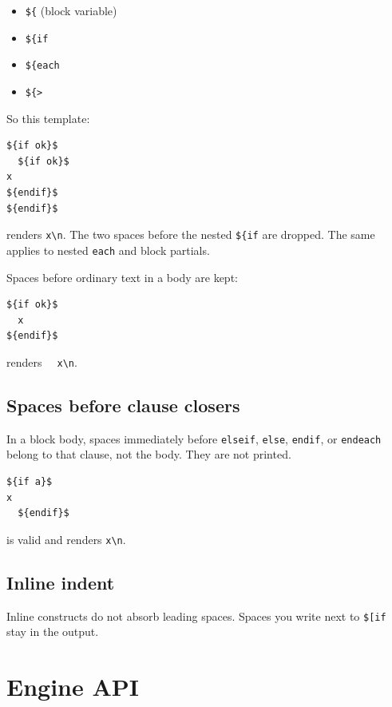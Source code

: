 \documentclass[11pt,letterpaper]{article}
\begin{document}
\begin{itemize}[nosep]
  \item \texttt{\$\{} (block variable)
  \item \texttt{\$\{if }
  \item \texttt{\$\{each }
  \item \texttt{\$\{> }
\end{itemize}

So this template:

\begin{lstlisting}[style=tmpl]
${if ok}$
  ${if ok}$
x
${endif}$
${endif}$
\end{lstlisting}

renders \texttt{x\textbackslash n}. The two spaces before the nested
\texttt{\$\{if} are dropped. The same applies to nested \texttt{each} and
block partials.

Spaces before ordinary text in a body are kept:

\begin{lstlisting}[style=tmpl]
${if ok}$
  x
${endif}$
\end{lstlisting}

renders \texttt{\ \ x\textbackslash n}.

\subsection{Spaces before clause closers}

In a block body, spaces immediately before \texttt{elseif}, \texttt{else},
\texttt{endif}, or \texttt{endeach} belong to that clause, not the body.
They are not printed.

\begin{lstlisting}[style=tmpl]
${if a}$
x
  ${endif}$
\end{lstlisting}

is valid and renders \texttt{x\textbackslash n}.

\subsection{Inline indent}

Inline constructs do not absorb leading spaces. Spaces you write next to
\texttt{\$[if} stay in the output.

\section{Engine API}
\label{sec:api}
\end{document}
